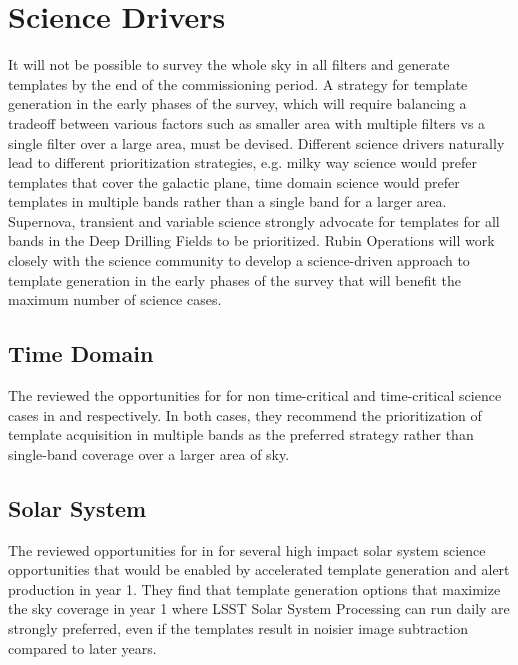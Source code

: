 \section{Science Drivers} \label{sec:science}

It will not be possible to survey the whole sky in all filters and generate templates by the end of the commissioning period. 
A strategy for template generation in the early phases of the survey, which will require balancing a tradeoff between various factors such as smaller area with multiple filters vs a single filter over a large area, must be devised. 
Different science drivers naturally lead to different prioritization strategies, e.g. milky way science would prefer templates that cover the galactic plane, time domain science would prefer templates in multiple bands rather than a single band for a larger area. 
Supernova, transient and variable science strongly advocate for templates for all bands in the Deep Drilling Fields to be prioritized. 
Rubin Operations will work closely with the science community to develop a science-driven approach to template generation in the early phases of the survey that will benefit the maximum number of science cases. 

\subsection{Time Domain}

The \tvssc reviewed the opportunities for \es for non time-critical and time-critical science cases in \citep{Hambleton_2020} and \citep{Street_2020} respectively. 
In both cases, they recommend the prioritization of template acquisition in multiple bands as the preferred strategy rather than single-band  coverage over a larger area of sky. 

\subsection{Solar System}

The \sssc reviewed opportunities for \es in \citep{2020arXiv201005926L} for several high impact solar system science opportunities that would be enabled by accelerated template generation and alert production in year 1. 
They find that template generation options that maximize the sky coverage in year 1 where LSST Solar System Processing can run daily are strongly preferred, even if the templates result in noisier image subtraction compared to later years.

